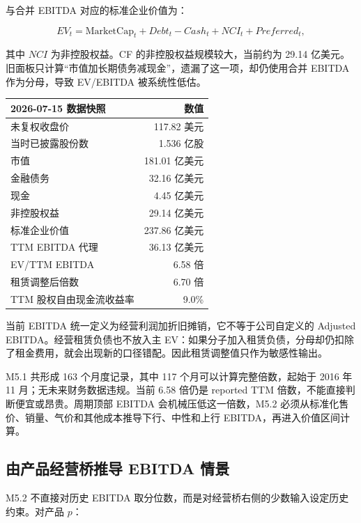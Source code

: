 \documentclass[11pt,a4paper]{ctexart}
\begin{document}
与合并 EBITDA 对应的标准企业价值为：

\begin{equation*}
EV_t=\text{MarketCap}_t+Debt_t-Cash_t+NCI_t+Preferred_t,
\end{equation*}

其中 $NCI$ 为非控股权益。CF 的非控股权益规模较大，当前约为 29.14 亿美元。旧面板只计算“市值加长期债务减现金”，遗漏了这一项，却仍使用合并 EBITDA 作为分母，导致 EV/EBITDA 被系统性低估。

\begin{center}
\small
\begin{tabular}{l r}
\toprule
2026-07-15 数据快照 & 数值 \\
\midrule
未复权收盘价 & 117.82 美元 \\
当时已披露股份数 & 1.536 亿股 \\
市值 & 181.01 亿美元 \\
金融债务 & 32.16 亿美元 \\
现金 & 4.45 亿美元 \\
非控股权益 & 29.14 亿美元 \\
标准企业价值 & 237.86 亿美元 \\
TTM EBITDA 代理 & 36.13 亿美元 \\
EV/TTM EBITDA & 6.58 倍 \\
租赁调整后倍数 & 6.70 倍 \\
TTM 股权自由现金流收益率 & 9.0\% \\
\bottomrule
\end{tabular}
\normalsize
\end{center}

当前 EBITDA 统一定义为经营利润加折旧摊销，它不等于公司自定义的 Adjusted EBITDA。经营租赁负债也不放入主 EV：如果分子加入租赁负债，分母却仍扣除了租金费用，就会出现新的口径错配。因此租赁调整值只作为敏感性输出。

M5.1 共形成 163 个月度记录，其中 117 个月可以计算完整倍数，起始于 2016 年 11 月；无未来财务数据违规。当前 6.58 倍仍是 reported TTM 倍数，不能直接判断便宜或昂贵。周期顶部 EBITDA 会机械压低这一倍数，M5.2 必须从标准化售价、销量、气价和其他成本推导下行、中性和上行 EBITDA，再进入价值区间计算。

\subsection{由产品经营桥推导 EBITDA 情景}

M5.2 不直接对历史 EBITDA 取分位数，而是对经营桥右侧的少数输入设定历史约束。对产品 $p$：
\end{document}

